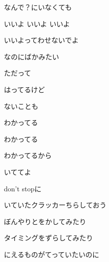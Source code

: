 \documentclass[a4paper,tate,twocolumn,12pt]{ltjtarticle}
\begin{document}
\begin{flushleft}
\noindent\begin{minipage}{\linewidth}
なんで？にいなくても

いいよ いいよ いいよ

いいよってわせないでよ

なのにばかみたい

ただって

はってるけど

ないことも

わかってる

わかってる

わかってるから

いててよ

don't stopに

いていたクラッカーちらしておう
\end{minipage}

\vspace{2em}

\noindent\begin{minipage}{\linewidth}
ぼんやりとをかしてみたり

タイミングをずらしてみたり

にえるものがてっていたいのに
\end{minipage}

\end{flushleft}
\end{document}
